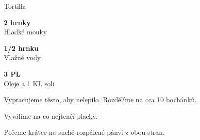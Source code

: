 \documentclass[11pt,a4paper]{article}
\begin{document}
\begin{recipe}[ForestGreen]{Tortilla}
    \begin{ingredients}
        \item \parbox[t]{\linewidth}{\raggedright \piece \textbf{2 hrnky}\\ Hladké mouky}
        \item \parbox[t]{\linewidth}{\raggedright \liquid \textbf{1/2 hrnku}\\ Vlažné vody}
        \item \parbox[t]{\linewidth}{\raggedright \spoon \textbf{3 PL}\\ Oleje a 1 KL soli}
    \end{ingredients}
    \begin{steps}
        \item Vypracujeme těsto, aby nelepilo. Rozdělíme na cca 10 bochánků.
        \item Vyválíme na co nejtenčí placky.
        \item Pečeme krátce na suché rozpálené pánvi z obou stran.
    \end{steps}
\end{recipe}
\end{document}
